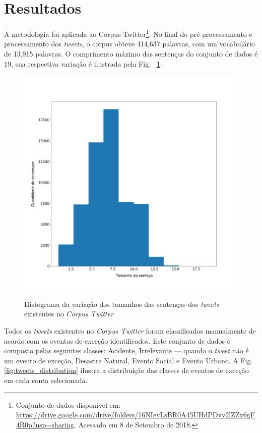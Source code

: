 \documentclass[
	12pt,				%
	oneside,			%
	a4paper,			%
	english,			%
	brazil				%
	]{abntex2ppgsi}
\begin{document}
{{\section{Resultados}
	
A metodologia foi aplicada ao Corpus Twitter\footnote{Conjunto de dados disponível em: \url{https://drive.google.com/drive/folders/16NIevLsBR0A45UHdPDvv2lZZx6gF4R0p?usp=sharing}. Acessado em 8 de Setembro de 2018.}. No final do pré-processamento e processamento dos \textit{tweets}, o corpus obteve 414,637 palavras, com um vocabulário de 13,915 palavras. O comprimento máximo das sentenças do conjunto de dados é 19, sua respectiva variação é ilustrada pela Fig. ~\ref{fig:corpus_metrics}.
 
\begin{figure}[!htb]
	\centering
 	  \caption{Histograma da variação dos tamanhos das sentenças dos \textit{tweets} existentes no \textit{Corpus Twitter}}
		\includegraphics[width=1\linewidth]{images/corpus_metrics_pt.png}
	\label{fig:corpus_metrics}
\end{figure}

Todos os \textit{tweets} existentes no \textit{Corpus Twitter} foram classificados manualmente de acordo com os eventos de exceção identificados. Este conjunto de dados é composto pelas seguintes classes: Acidente, Irrelevante --- quando o \textit{tweet} não é um evento de exceção, Desastre Natural, Evento Social e Evento Urbano. A Fig. \ref{fig:tweets_distribution} ilustra a distribuição das classes de eventos de exceção em cada conta selecionada.

}}
\end{document}
